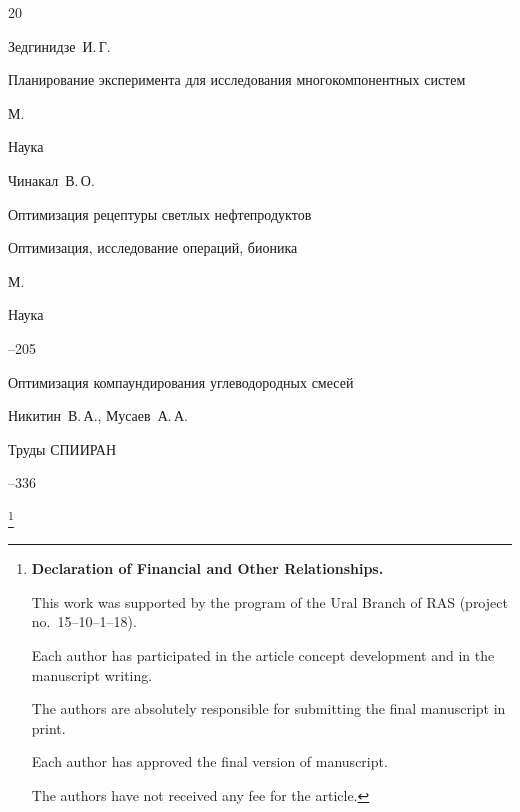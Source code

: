 \begin{thebibliography}{20}

\by Зедгинидзе~И.\,Г.

\book Планирование эксперимента для исследования многокомпонентных систем

\publaddr М.

\publ Наука







\by Чинакал~В.\,О.

\paper Оптимизация рецептуры светлых нефтепродуктов

\inbook Оптимизация, исследование операций, бионика

\publaddr М.

\publ Наука


--205





\paper Оптимизация компаундирования углеводородных смесей

\by Никитин~В.\,А., Мусаев~А.\,А.

\jour Труды СПИИРАН



--336



\end{thebibliography}



\RuDate









\newpage



\makeentitle



\thanks{{\bf Declaration of Financial and Other Relationships.}

This work was supported by the program of the Ural Branch of RAS (project no.~15--10--1--18).

Each author has participated in the article concept development and in the manuscript writing.

The authors are absolutely responsible for submitting the final manuscript in print.

Each author has approved the final version of manuscript.

The authors have not received any fee for the article.

}



